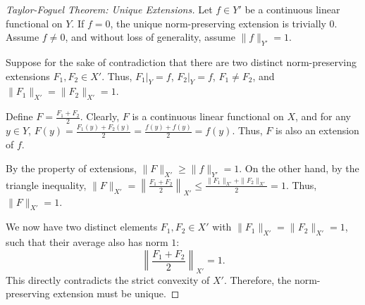 \documentclass{article}
\begin{document}
\begin{proof}[Taylor-Foguel Theorem: Unique Extensions]
    Let $f \in Y'$ be a continuous linear functional on $Y$. If $f = 0$, the unique norm-preserving extension is trivially $0$. Assume $f \neq 0$, and without loss of generality, assume $\|f\|_{Y'} = 1$.

    Suppose for the sake of contradiction that there are two distinct norm-preserving extensions $F_1, F_2 \in X'$. Thus, $F_1|_Y = f$, $F_2|_Y = f$, $F_1 \neq F_2$, and $\|F_1\|_{X'} = \|F_2\|_{X'} = 1$.

    Define $F = \frac{F_1 + F_2}{2}$. Clearly, $F$ is a continuous linear functional on $X$, and for any $y \in Y$, $F(y) = \frac{F_1(y) + F_2(y)}{2} = \frac{f(y) + f(y)}{2} = f(y)$. Thus, $F$ is also an extension of $f$.

    By the property of extensions, $\|F\|_{X'} \ge \|f\|_{Y'} = 1$.
    On the other hand, by the triangle inequality, $\|F\|_{X'} = \left\| \frac{F_1 + F_2}{2} \right\|_{X'} \le \frac{\|F_1\|_{X'} + \|F_2\|_{X'}}{2} = 1$.
    Thus, $\|F\|_{X'} = 1$.

    We now have two distinct elements $F_1, F_2 \in X'$ with $\|F_1\|_{X'} = \|F_2\|_{X'} = 1$, such that their average also has norm $1$:
    \[ \left\| \frac{F_1 + F_2}{2} \right\|_{X'} = 1. \]
    This directly contradicts the strict convexity of $X'$. Therefore, the norm-preserving extension must be unique.
\end{proof}

\vspace{0.5cm}
\end{document}
